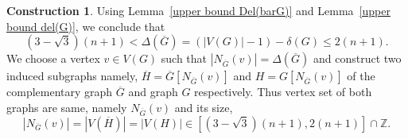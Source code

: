 \documentclass[reqno,10pt]{amsart}
\theoremstyle{definition}
\newtheorem{construction}[theorem]{Construction}
\begin{document}
 
\begin{construction}
Using Lemma~\ref{upper bound Del(barG)} and Lemma~\ref{upper bound del(G)}, we conclude that 
\begin{equation*}
(3-\sqrt{3})(n+1)<\Delta(\overline{G})= (|V(G)|-1)-\delta(G)\leq2(n+1). 
\end{equation*}
We choose a vertex $v\in V(G)$ such that $|N_{\overline{G}}(v)|=\Delta(\overline{G})$ and construct two induced subgraphs namely, $\overline{H}=\overline{G}[N_{\overline{G}}(v)]$ and $H=G[N_{\overline{G}}(v)]$  of the complementary graph $\overline{G}$ and graph $G$ respectively. Thus vertex set of both graphs are same, namely $N_{\overline{G}}(v)$ and its size,
\begin{equation*}
 |N_{\overline{G}}(v)|=|V(\overline{H})|=|V(H)|\in[(3-\sqrt{3})(n+1) , 2(n+1)]\cap\mathbb{Z}.   
\end{equation*}    
\end{construction}
\end{document}
